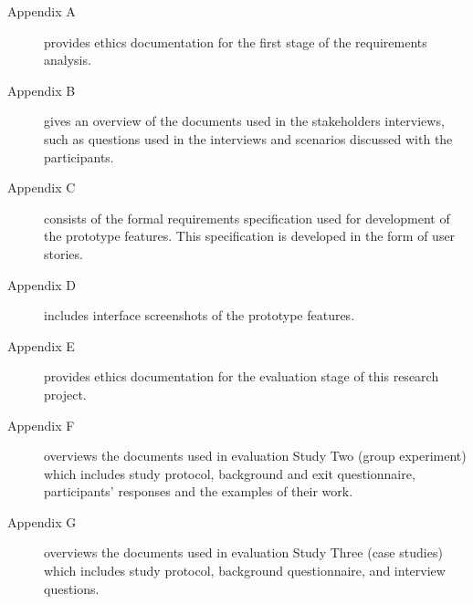 \begin{description}
\item[Appendix A] provides ethics documentation for the first stage of the
requirements analysis.
\item[Appendix B] gives an overview of the documents used in the stakeholders
interviews, such as questions used in the interviews and scenarios discussed
with the participants.
\item[Appendix C] consists of the formal requirements specification used for
development of the prototype features. This specification is developed in the
form of user stories.
\item[Appendix D] includes interface screenshots of the prototype features. 
\item[Appendix E] provides ethics documentation for the evaluation stage of this
research project.
\item[Appendix F] overviews the documents used in evaluation Study Two (group
experiment) which includes study protocol, background and exit questionnaire,
participants' responses and the examples of their work.
\item[Appendix G] overviews the documents used in evaluation Study Three (case
studies) which includes study protocol, background questionnaire, and interview
questions.
\end{description}